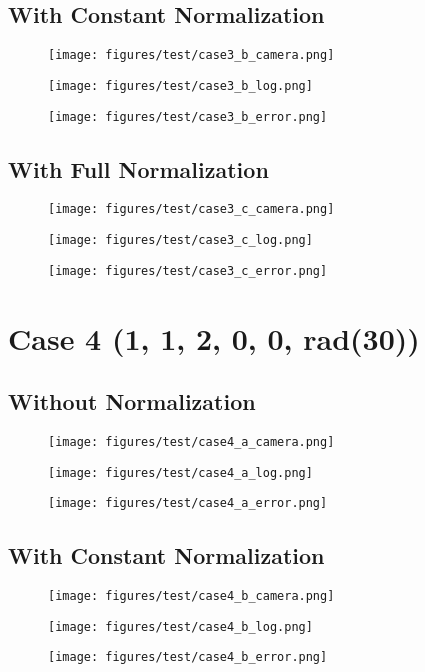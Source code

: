 \subsection{With Constant Normalization}
\begin{figure}[ht!] \centering \texttt{[image: figures/test/case3\_b\_camera.png]} \end{figure}
\begin{figure}[ht!] \centering \texttt{[image: figures/test/case3\_b\_log.png]} \end{figure}
\begin{figure}[ht!] \centering \texttt{[image: figures/test/case3\_b\_error.png]} \end{figure}
\clearpage
\subsection{With Full Normalization}
\begin{figure}[ht!] \centering \texttt{[image: figures/test/case3\_c\_camera.png]} \end{figure}
\begin{figure}[ht!] \centering \texttt{[image: figures/test/case3\_c\_log.png]} \end{figure}
\begin{figure}[ht!] \centering \texttt{[image: figures/test/case3\_c\_error.png]} \end{figure}
\clearpage

\section{Case 4 (1, 1, 2, 0, 0, rad(30))}
\subsection{Without Normalization}
\begin{figure}[ht!] \centering \texttt{[image: figures/test/case4\_a\_camera.png]} \end{figure}
\begin{figure}[ht!] \centering \texttt{[image: figures/test/case4\_a\_log.png]} \end{figure}
\begin{figure}[ht!] \centering \texttt{[image: figures/test/case4\_a\_error.png]} \end{figure}
\clearpage
\subsection{With Constant Normalization}
\begin{figure}[ht!] \centering \texttt{[image: figures/test/case4\_b\_camera.png]} \end{figure}
\begin{figure}[ht!] \centering \texttt{[image: figures/test/case4\_b\_log.png]} \end{figure}
\begin{figure}[ht!] \centering \texttt{[image: figures/test/case4\_b\_error.png]} \end{figure}
\clearpage
